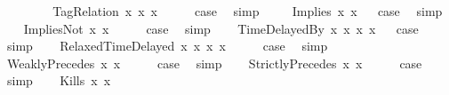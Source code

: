 \begin{isabellebody}
\isanewline
\ \ \ \ \isamarkupfalse%
\isanewline
\ \ \isamarkupfalse%
\isanewline
{}\isamarkupfalse%
\isanewline
{}\isamarkupfalse%
\ {\isacharparenleft}TagRelation\ x{}\ x{}\ x{}{\isacharparenright}\isanewline
\ \ \isamarkupfalse%
\ \isamarkupfalse%
\ {\isacharquery}case\ \isamarkupfalse%
\ simp\ \isanewline
{}\isamarkupfalse%
\isanewline
\ \ \isamarkupfalse%
\ {\isacharparenleft}Implies\ x{}\ x{}{\isacharparenright}\isanewline
{}\isamarkupfalse%
\ \isamarkupfalse%
\ {\isacharquery}case\ \isamarkupfalse%
\ simp\ \isanewline
{}\isamarkupfalse%
\isanewline
\ \ \isamarkupfalse%
\ {\isacharparenleft}ImpliesNot\ x{}\ x{}{\isacharparenright}\isanewline
\ \ \isamarkupfalse%
\ \isamarkupfalse%
\ {\isacharquery}case\ \isamarkupfalse%
\ simp\isanewline
{}\isamarkupfalse%
\isanewline
\ \ \isamarkupfalse%
\ {\isacharparenleft}TimeDelayedBy\ x{}\ x{}\ x{}\ x{}{\isacharparenright}\isanewline
{}\isamarkupfalse%
\ \isamarkupfalse%
\ {\isacharquery}case\ \isamarkupfalse%
\ simp\isanewline
{}\isamarkupfalse%
\isanewline
\ \ \isamarkupfalse%
\ {\isacharparenleft}RelaxedTimeDelayed\ x{}\ x{}\ x{}\ x{}{\isacharparenright}\isanewline
\ \ \isamarkupfalse%
\ \isamarkupfalse%
\ {\isacharquery}case\ \isamarkupfalse%
\ simp\isanewline
{}\isamarkupfalse%
\isanewline
\ \ \isamarkupfalse%
\ {\isacharparenleft}WeaklyPrecedes\ x{}\ x{}{\isacharparenright}\isanewline
\ \ \isamarkupfalse%
\ \isamarkupfalse%
\ {\isacharquery}case\ \isamarkupfalse%
\ simp\isanewline
{}\isamarkupfalse%
\isanewline
\ \ \isamarkupfalse%
\ {\isacharparenleft}StrictlyPrecedes\ x{}\ x{}{\isacharparenright}\isanewline
\ \ \isamarkupfalse%
\ \isamarkupfalse%
\ {\isacharquery}case\ \isamarkupfalse%
\ simp\isanewline
{}\isamarkupfalse%
\isanewline
\ \ \isamarkupfalse%
\ {\isacharparenleft}Kills\ x{}\ x{}{\isacharparenright}\isanewline

\end{isabellebody}
